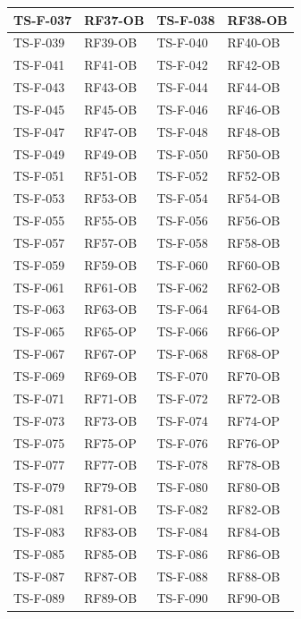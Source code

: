 \documentclass[a4paper,12pt]{article}
\begin{document}
{\begin{longtable}{|p{2.5cm}|p{2.2cm}|p{2.5cm}|p{2.2cm}|}
    \hline
    TS-F-037 & RF37-OB & TS-F-038 & RF38-OB \\
    \hline
    TS-F-039 & RF39-OB & TS-F-040 & RF40-OB \\
    \hline
    TS-F-041 & RF41-OB & TS-F-042 & RF42-OB \\
    \hline
    TS-F-043 & RF43-OB & TS-F-044 & RF44-OB \\
    \hline
    TS-F-045 & RF45-OB & TS-F-046 & RF46-OB \\
    \hline
    TS-F-047 & RF47-OB & TS-F-048 & RF48-OB \\
    \hline
    TS-F-049 & RF49-OB & TS-F-050 & RF50-OB \\
    \hline
    TS-F-051 & RF51-OB & TS-F-052 & RF52-OB \\
    \hline
    TS-F-053 & RF53-OB & TS-F-054 & RF54-OB \\
    \hline
    TS-F-055 & RF55-OB & TS-F-056 & RF56-OB \\
    \hline
    TS-F-057 & RF57-OB & TS-F-058 & RF58-OB \\
    \hline
    TS-F-059 & RF59-OB & TS-F-060 & RF60-OB \\
    \hline
    TS-F-061 & RF61-OB & TS-F-062 & RF62-OB \\
    \hline
    TS-F-063 & RF63-OB & TS-F-064 & RF64-OB \\
    \hline
    TS-F-065 & RF65-OP & TS-F-066 & RF66-OP \\
    \hline
    TS-F-067 & RF67-OP & TS-F-068 & RF68-OP \\
    \hline
    TS-F-069 & RF69-OB & TS-F-070 & RF70-OB \\
    \hline
    TS-F-071 & RF71-OB & TS-F-072 & RF72-OB \\
    \hline
    TS-F-073 & RF73-OB & TS-F-074 & RF74-OP \\
    \hline
    TS-F-075 & RF75-OP & TS-F-076 & RF76-OP \\
    \hline
    TS-F-077 & RF77-OB & TS-F-078 & RF78-OB \\
    \hline
    TS-F-079 & RF79-OB & TS-F-080 & RF80-OB \\
    \hline
    TS-F-081 & RF81-OB & TS-F-082 & RF82-OB \\
    \hline
    TS-F-083 & RF83-OB & TS-F-084 & RF84-OB \\
    \hline
    TS-F-085 & RF85-OB & TS-F-086 & RF86-OB \\
    \hline
    TS-F-087 & RF87-OB & TS-F-088 & RF88-OB \\
    \hline
    TS-F-089 & RF89-OB & TS-F-090 & RF90-OB \\

\end{longtable}}
\end{document}
